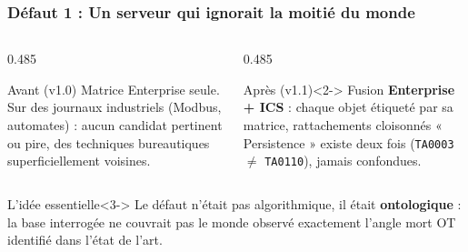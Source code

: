 \documentclass[aspectratio=169,11pt]{beamer}
\begin{document}
\begin{frame}
  \frametitle{Défaut 1 : Un serveur qui ignorait la moitié du monde}
  \vspace{0.1cm}
  \begin{columns}[T]
    \begin{column}{0.485\textwidth}
      \begin{alertblock}{Avant (v1.0)}
        \footnotesize Matrice Enterprise seule. Sur des journaux industriels
        (Modbus, automates) : aucun candidat pertinent ou pire,
        des techniques bureautiques superficiellement voisines.
      \end{alertblock}
    \end{column}
    \begin{column}{0.485\textwidth}
      \begin{exampleblock}{Après (v1.1)}<2->
        \footnotesize Fusion \textbf{Enterprise + ICS} : chaque objet étiqueté
        par sa matrice, rattachements cloisonnés « Persistence »
        existe deux fois (\texttt{TA0003} $\neq$ \texttt{TA0110}), jamais
        confondues.
      \end{exampleblock}
    \end{column}
  \end{columns}
  \vspace{0.35cm}
  \begin{block}{L'idée essentielle}<3->
    Le défaut n'était pas algorithmique, il était \textbf{ontologique} : la
    base interrogée ne couvrait pas le monde observé exactement l'angle
    mort OT identifié dans l'état de l'art.
  \end{block}
\end{frame}
 
\end{document}
